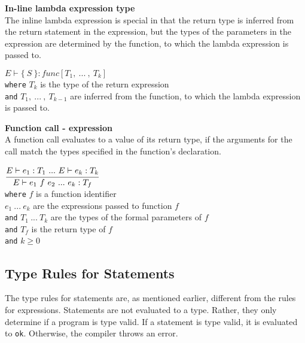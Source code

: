 \textbf{In-line lambda expression type}\\
The inline lambda expression is special in that the return type is inferred from the return statement in the expression, but the types of the parameters in the expression are determined by the function, to which the lambda expression is passed to.

\begin{center}
	\begin{math}
	E \vdash \{\ S\ \} : func[T_1,\ .
	.
	.
	\ ,\ T_k]
	\end{math}
	\\[1\baselineskip]
	\texttt{where} $T_k$ is the type of the return expression\\
	\texttt{and} $T_1, \ .
	.
	.
	\ ,\ T_{k-1}$ are inferred from the function, to which the lambda expression is passed to.
\end{center}

\textbf{Function call - expression}\\
A function call evaluates to a value of its return type, if the arguments for the call match the types specified in the function's declaration.

\begin{center}
	\begin{math}
		\cfrac
		{E \vdash e_1 : T_1 \ .
		.
		.
		\ E \vdash e_k : T_k}
		{E \vdash e_1\ f\ e_2 \ .
		.
		.
		\ e_k : T_f}
	\end{math}
	\\[1\baselineskip]
	\texttt{where} $f$ is a function identifier\\
	$e_1\ .
	.
	.
	\ e_k$ are the expressions passed to function $f$\\
	\texttt{and} $T_1\ .
	.
	.
	\ T_k$ are the types of the formal parameters of $f$\\
	\texttt{and} $T_f$ is the return type of $f$\\
	\texttt{and} $k \ge 0$
\end{center}



\subsection{Type Rules for Statements}
The type rules for statements are, as mentioned earlier, different from the rules for expressions.
Statements are not evaluated to a type.
Rather, they only determine if a program is type valid.
If a statement is type valid, it is evaluated to \texttt{ok}.
Otherwise, the compiler throws an error.

